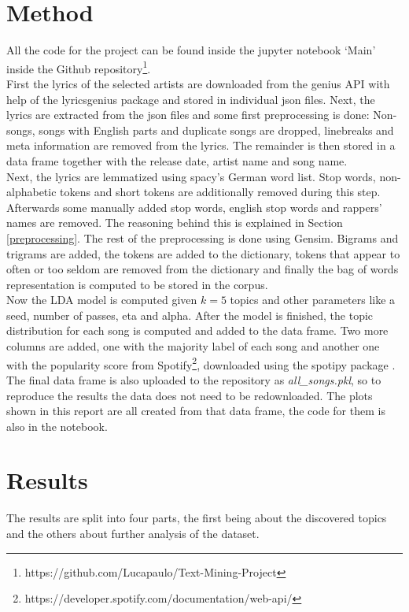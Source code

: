 \documentclass[conference]{IEEEtran}
\begin{document}
\section{Method}
All the code for the project can be found inside the jupyter notebook {\lq}Main{\rq} inside the Github repository\footnote{https://github.com/Lucapaulo/Text-Mining-Project}.\\
First the lyrics of the selected artists are downloaded from the genius API with help of the lyricsgenius package \cite{lyricsgenius} and stored in individual json files. Next, the lyrics are extracted from the json files and some first preprocessing is done: Non-songs, songs with English parts and duplicate songs are dropped, linebreaks and meta information are removed from the lyrics. The remainder is then stored in a data frame together with the release date, artist name and song name.\\
Next, the lyrics are lemmatized using spacy's German word list. Stop words, non-alphabetic tokens and short tokens are additionally removed during this step. Afterwards some manually added stop words, english stop words and rappers' names are removed. The reasoning behind this is explained in Section \ref{preprocessing}. The rest of the preprocessing is done using Gensim. Bigrams and trigrams are added, the tokens are added to the dictionary, tokens that appear to often or too seldom are removed from the dictionary and finally the bag of words representation is computed to be stored in the corpus.\\
Now the LDA model is computed given $k=5$ topics and other parameters like a seed, number of passes, eta and alpha. After the model is finished, the topic distribution for each song is computed and added to the data frame. Two more columns are added, one with the majority label of each song and another one with the popularity score from Spotify\footnote{https://developer.spotify.com/documentation/web-api/}, downloaded using the spotipy package \cite{spotipy}. The final data frame is also uploaded to the repository as \textit{all\_songs.pkl}, so to reproduce the results the data does not need to be redownloaded. The plots shown in this report are all created from that data frame, the code for them is also in the notebook.

\section{Results} \label{results}
The results are split into four parts, the first being about the discovered topics and the others about further analysis of the dataset.
\end{document}
